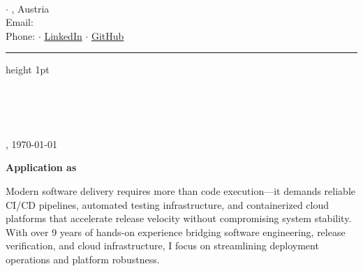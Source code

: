 \documentclass[11pt,a4paper]{article}
\begin{document}
\begin{minipage}[t]{0.55\textwidth}
    {\Large \bfseries \color{primary} \meinName}\\[0.2em]
    {\small \color{accent} \bfseries \stellenTitel}
\end{minipage}
\begin{minipage}[t]{0.45\textwidth}
    \raggedleft \footnotesize \color{textgray}
    \meineStrasse $\cdot$ \meinOrt, Austria\\
    Email: \href{mailto:\meineEmail}{\meineEmail}\\
    Phone: \meineTel $\cdot$ \href{\meinLinkedin}{LinkedIn} $\cdot$ \href{\meinGithub}{GitHub}
\end{minipage}

\vspace{0.8em}
\color{accent}\hrule height 1pt
\vspace{1.0em}

\begin{minipage}[t]{0.55\textwidth}
    \color{primary} \small
    \textbf{\firmenName}\\[0.15em]
    \ansprechPartner\\[0.15em]
    \firmenAdresse\\[0.15em]
\end{minipage}
\begin{minipage}[t]{0.45\textwidth}
    \raggedleft \small \color{textgray}
    \meinOrt, \today
\end{minipage}

\vspace{1.2em}

\vspace{0.8cm}
{\Large\bfseries\color{primary} Application as \stellenTitel}


\vspace{0.6em}

\color{primary} \small

\anrede

Modern software delivery requires more than code execution—it demands reliable CI/CD pipelines, automated testing infrastructure, and containerized cloud platforms that accelerate release velocity without compromising system stability. With over 9 years of hands-on experience bridging software engineering, release verification, and cloud infrastructure, I focus on streamlining deployment operations and platform robustness.
\end{document}
